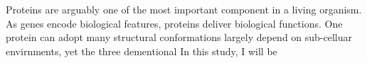 Proteins are arguably one of the most important component in a living organism. As genes encode biological features, proteins deliver biological functions. One protein can adopt many structural conformations largely depend on sub-celluar envirnments, yet the three dementional      In this study, I will be 